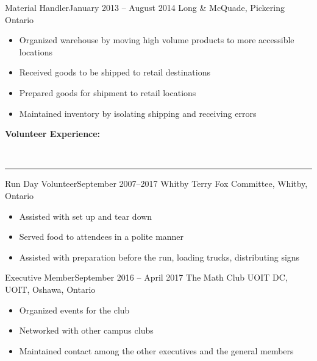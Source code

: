 \documentclass[]{article}
\makeatletter
\newcommand{\heading}[1]
{\begin{large}\textbf{#1}\end{large}\\%
 \rule[1.2ex]{\linewidth}{0.4pt}}
\newenvironment{*subsection}[2]
{
\begin{tabu} to \linewidth {@{}X[l] r}
  \textbf{#1} &
  \textbf{#2}
\end{tabu}
}
{
  \vspace{3mm}
}
\makeatother
\begin{document}
\begin{*subsection}{Material Handler}{January 2013 -- August 2014}
%
Long \& McQuade, Pickering Ontario
%
\begin{itemize}
\item
  Organized warehouse by moving high volume products to more
  accessible locations
\item
  Received goods to be shipped to retail destinations
\item
  Prepared goods for shipment to retail locations
\item
  Maintained inventory by isolating shipping and receiving errors
\end{itemize}
\end{*subsection}
\heading{Volunteer Experience:}
\begin{*subsection}{Run Day Volunteer}{September 2007--2017}
%
Whitby Terry Fox Committee, Whitby, Ontario
%
\begin{itemize}
\item
  Assisted with set up and tear down
\item
  Served food to attendees in a polite manner
\item
  Assisted with preparation before the run, loading trucks,
  distributing signs
\end{itemize}
\end{*subsection}
\begin{*subsection}{Executive Member}{September 2016 -- April 2017}
%
The Math Club UOIT DC, UOIT, Oshawa, Ontario
%
\begin{itemize}
\item
  Organized events for the club
\item
  Networked with other campus clubs
\item
  Maintained contact among the other executives and the general members
\end{itemize}
\end{*subsection}
\end{document}
